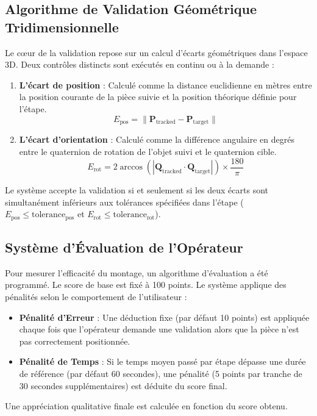\documentclass[12pt,a4paper]{article}
\begin{document}
\subsection{Algorithme de Validation Géométrique Tridimensionnelle}
Le cœur de la validation repose sur un calcul d'écarts géométriques dans l'espace 3D. Deux contrôles distincts sont exécutés en continu ou à la demande :
\begin{enumerate}
    \item \textbf{L'écart de position} : Calculé comme la distance euclidienne en mètres entre la position courante de la pièce suivie et la position théorique définie pour l'étape.
    \[ E_{\text{pos}} = \| \mathbf{P}_{\text{tracked}} - \mathbf{P}_{\text{target}} \| \]
    
    \item \textbf{L'écart d'orientation} : Calculé comme la différence angulaire en degrés entre le quaternion de rotation de l'objet suivi et le quaternion cible.
    \[ E_{\text{rot}} = 2 \arccos(| \mathbf{Q}_{\text{tracked}} \cdot \mathbf{Q}_{\text{target}} |) \times \frac{180}{\pi} \]
\end{enumerate}

Le système accepte la validation si et seulement si les deux écarts sont simultanément inférieurs aux tolérances spécifiées dans l'étape ($E_{\text{pos}} \le \text{tolerance}_{\text{pos}}$ et $E_{\text{rot}} \le \text{tolerance}_{\text{rot}}$).

\subsection{Système d'Évaluation de l'Opérateur}
Pour mesurer l'efficacité du montage, un algorithme d'évaluation a été programmé. Le score de base est fixé à 100 points. Le système applique des pénalités selon le comportement de l'utilisateur :
\begin{itemize}
    \item \textbf{Pénalité d'Erreur} : Une déduction fixe (par défaut 10 points) est appliquée chaque fois que l'opérateur demande une validation alors que la pièce n'est pas correctement positionnée.
    \item \textbf{Pénalité de Temps} : Si le temps moyen passé par étape dépasse une durée de référence (par défaut 60 secondes), une pénalité (5 points par tranche de 30 secondes supplémentaires) est déduite du score final.
\end{itemize}
Une appréciation qualitative finale est calculée en fonction du score obtenu.
\end{document}
